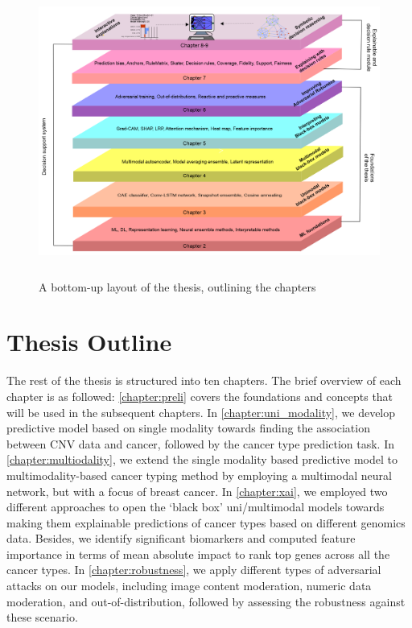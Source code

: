 \begin{figure}[h]
	\centering
		\includegraphics[width=\linewidth,height=95mm]{images/chapter_outline.png}
		\caption{A bottom-up layout of the thesis, outlining the chapters}
        \label{fig:chapter_organization}
\end{figure}

\section{Thesis Outline} \label{structure}
The rest of the thesis is structured into ten chapters. The brief overview of each chapter is as followed: \cref{chapter:preli} covers the foundations and concepts that will be used in the subsequent chapters. In \cref{chapter:uni_modality}, we develop predictive model based on single modality towards finding the association between CNV data and cancer, followed by the cancer type prediction task. In \cref{chapter:multiodality}, we extend the single modality based predictive model to multimodality-based cancer typing method by employing a multimodal neural network, but with a focus of breast cancer. In \cref{chapter:xai}, we employed two different approaches to open the `black box' uni/multimodal models towards making them explainable predictions of cancer types based on different genomics data. Besides, we identify significant biomarkers and computed feature importance in terms of mean absolute impact to rank top genes across all the cancer types. In \cref{chapter:robustness}, we apply different types of adversarial attacks on our models, including image content moderation, numeric data moderation, and out-of-distribution, followed by assessing the robustness against these scenario. 

